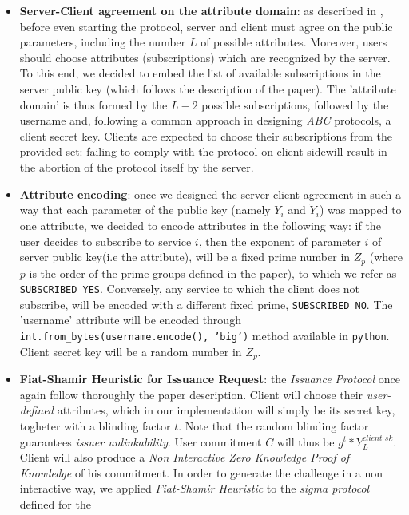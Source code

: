 \documentclass[10pt,conference,compsocconf]{IEEEtran}
\begin{document}
\begin{itemize}
    \item \textbf{Server-Client agreement on the attribute domain}: as described in \cite{PS_signature}, before even starting the protocol,
    server and client must agree on the public parameters, including the number $L$ of possible attributes. Moreover, users should choose
    attributes (subscriptions) which are recognized by the server. To this end, we decided to embed the list of available subscriptions
    in the server public key (which follows the description of the paper). The 'attribute domain' is thus formed by the $L-2$ possible
    subscriptions, followed by the username and, following a common approach in designing \textit{ABC} protocols, a client secret key.
    Clients are expected to choose their subscriptions from the provided set: failing to comply with the protocol on client sidewill result in the
    abortion of the protocol itself by the server.
    \item \textbf{Attribute encoding}: once we designed the server-client agreement in such a way that each parameter of the public key
    (namely $Y_i$ and $\tilde{Y}_{i}$) was mapped to one attribute, we decided to encode attributes in the following way:
    if the user decides to subscribe to service $i$, then the exponent of parameter $i$ of server public key(i.e the attribute),
     will be a fixed prime number in $Z_p$ (where $p$ is the order of the prime groups defined in the paper),
    to which we refer as \texttt{SUBSCRIBED\_YES}. Conversely, any service to which the client does not subscribe,
    will be encoded with a different fixed prime, \texttt{SUBSCRIBED\_NO}. The 'username' attribute will be encoded through
    \texttt{int.from\_bytes(username.encode(), 'big')} method available in \texttt{python}. Client secret key will be a
    random number in $Z_p$.
    \item \textbf{Fiat-Shamir Heuristic for Issuance Request}: the \textit{Issuance Protocol} once again follow thoroughly the paper description.
    Client will choose their \textit{user-defined} attributes, which in our implementation will simply be its secret key,
    togheter with a blinding factor $t$. Note that the random blinding factor guarantees \textit{issuer unlinkability}. User commitment $C$ will thus be $g^{t}*Y_{L}^{client\_sk}$. Client will also produce a
    \textit{Non Interactive Zero Knowledge Proof of Knowledge} of his commitment. In order to generate the challenge in a
    non interactive way, we applied \textit{Fiat-Shamir Heuristic} to the \textit{sigma protocol} defined for the

\end{itemize}
\end{document}
